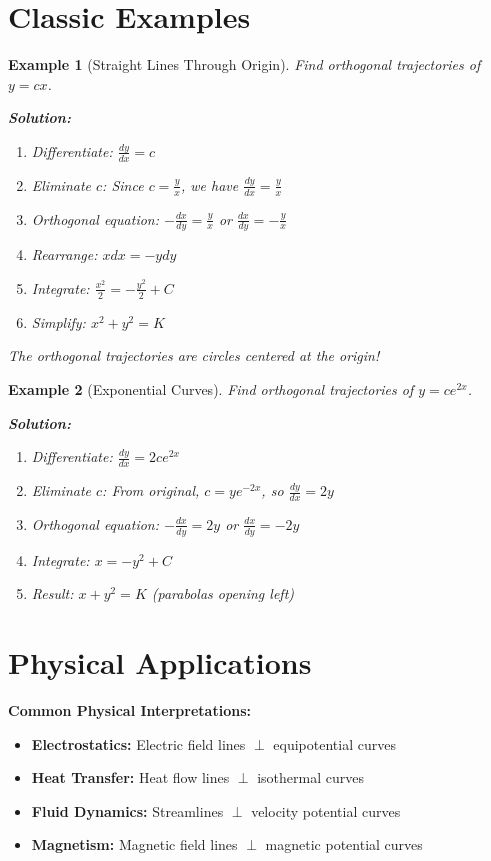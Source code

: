 \documentclass[12pt]{article}
\newtheorem{example}{Example}
\begin{document}
\section{Classic Examples}

\begin{example}[Straight Lines Through Origin]
Find orthogonal trajectories of $y = cx$.

\textbf{Solution:}
\begin{enumerate}
    \item Differentiate: $\frac{dy}{dx} = c$
    \item Eliminate $c$: Since $c = \frac{y}{x}$, we have $\frac{dy}{dx} = \frac{y}{x}$
    \item Orthogonal equation: $-\frac{dx}{dy} = \frac{y}{x}$ or $\frac{dx}{dy} = -\frac{y}{x}$
    \item Rearrange: $x dx = -y dy$
    \item Integrate: $\frac{x^2}{2} = -\frac{y^2}{2} + C$
    \item Simplify: $x^2 + y^2 = K$
\end{enumerate}
The orthogonal trajectories are circles centered at the origin!
\end{example}

\begin{example}[Exponential Curves]
Find orthogonal trajectories of $y = ce^{2x}$.

\textbf{Solution:}
\begin{enumerate}
    \item Differentiate: $\frac{dy}{dx} = 2ce^{2x}$
    \item Eliminate $c$: From original, $c = ye^{-2x}$, so $\frac{dy}{dx} = 2y$
    \item Orthogonal equation: $-\frac{dx}{dy} = 2y$ or $\frac{dx}{dy} = -2y$
    \item Integrate: $x = -y^2 + C$
    \item Result: $x + y^2 = K$ (parabolas opening left)
\end{enumerate}
\end{example}

\section{Physical Applications}

\begin{keypoint}
\textbf{Common Physical Interpretations:}
\begin{itemize}
    \item \textbf{Electrostatics:} Electric field lines $\perp$ equipotential curves
    \item \textbf{Heat Transfer:} Heat flow lines $\perp$ isothermal curves  
    \item \textbf{Fluid Dynamics:} Streamlines $\perp$ velocity potential curves
    \item \textbf{Magnetism:} Magnetic field lines $\perp$ magnetic potential curves
\end{itemize}
\end{keypoint}
\end{document}
